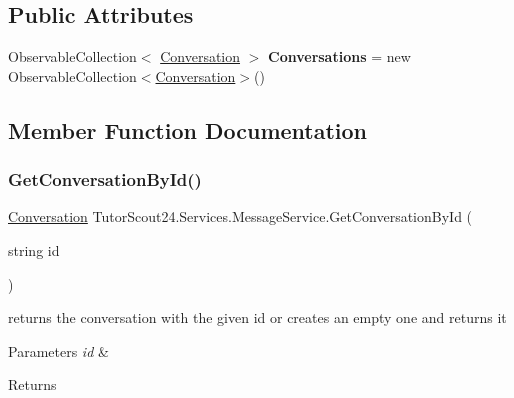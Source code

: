\subsection*{Public Attributes}
\begin{DoxyCompactItemize}
\item 
\mbox{\label{class_tutor_scout24_1_1_services_1_1_message_service_ab4fcf14142bb7be69e4341cc1a8940d5}} 
Observable\+Collection$<$ \mbox{\hyperlink{class_tutor_scout24_1_1_models_1_1_chat_1_1_conversation}{Conversation}} $>$ {\bfseries Conversations} = new Observable\+Collection$<$\mbox{\hyperlink{class_tutor_scout24_1_1_models_1_1_chat_1_1_conversation}{Conversation}}$>$()
\end{DoxyCompactItemize}


\subsection{Member Function Documentation}
\mbox{\label{class_tutor_scout24_1_1_services_1_1_message_service_a85c1daee447550a3368d544643dceac6}} 
\subsubsection{\texorpdfstring{Get\+Conversation\+By\+Id()}{GetConversationById()}}
{\footnotesize\ttfamily \mbox{\hyperlink{class_tutor_scout24_1_1_models_1_1_chat_1_1_conversation}{Conversation}} Tutor\+Scout24.\+Services.\+Message\+Service.\+Get\+Conversation\+By\+Id (\begin{DoxyParamCaption}\item[{string}]{id }\end{DoxyParamCaption})\hspace{0.3cm}{\ttfamily [inline]}}



returns the conversation with the given id or creates an empty one and returns it 


\begin{DoxyParams}{Parameters}
{\em id} & \\
\hline
\end{DoxyParams}
\begin{DoxyReturn}{Returns}

\end{DoxyReturn}
\mbox{\label{class_tutor_scout24_1_1_services_1_1_message_service_a1a170ef80b97e859c90b2cd709ec4407}} 
